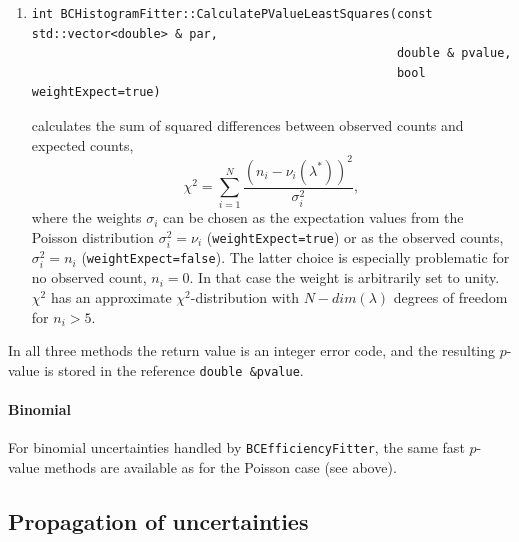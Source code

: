 \documentclass[11pt, a4paper]{article}
\begin{document}
\begin{enumerate}
\item
%
\begin{verbatim}
int BCHistogramFitter::CalculatePValueLeastSquares(const std::vector<double> & par,
                                                   double & pvalue,
                                                   bool weightExpect=true)
\end{verbatim}
%
calculates the sum of squared differences between observed counts and
expected counts, $$\chi^2 = \sum_{i=1}^N \frac{\left(n_i -
\nu_i(\lambda^{*})\right)^2}{\sigma_i^2},$$ where the weights
$\sigma_i$ can be chosen as the expectation values from the Poisson
distribution $\sigma_i^2 = \nu_i$ (\verb|weightExpect=true|) or as the
observed counts, $\sigma_i^2 = n_i$ (\verb|weightExpect=false|).  The
latter choice is especially problematic for no observed count, $n_i
=0$. In that case the weight is arbitrarily set to unity.  $\chi^2$
has an approximate $\chi^2$-distribution with $N-dim(\lambda)$ degrees
of freedom for $n_i>5$.
\end{enumerate}
In all three methods the return value is an integer error code, and
the resulting $p$-value is stored in the reference
\verb|double &pvalue|.

\paragraph{Binomial} For binomial uncertainties handled by
\verb|BCEfficiencyFitter|, the same fast $p$-value methods are available as for
the Poisson case (see above).


\subsection{Propagation of uncertainties}
\end{document}
